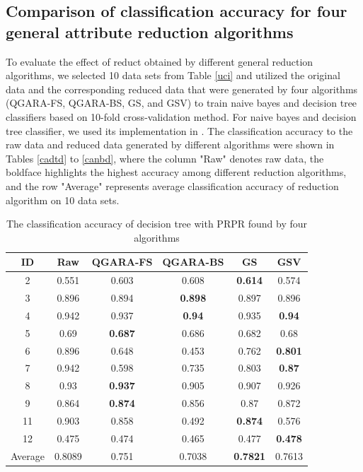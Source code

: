 \documentclass[review]{elsarticle}
\begin{document}
	\subsection{Comparison of classification accuracy for four general attribute reduction algorithms}
		\par To evaluate the effect of reduct obtained by different general reduction algorithms, we selected 10 data sets from Table \ref{uci} and utilized the original data and the corresponding reduced data that were generated by four algorithms (QGARA-FS, QGARA-BS, GS, and GSV) to train naive bayes and decision tree classifiers based on 10-fold cross-validation method. For naive bayes and decision tree classifier, we used its implementation in \cite{scikit-learn}. The classification accuracy to the raw data and reduced data generated by different algorithms were shown in Tables \ref{cadtd} to \ref{canbd}, where the column "Raw" denotes raw data, the boldface highlights the highest accuracy among different reduction algorithms, and the row "Average" represents average classification accuracy of reduction algorithm on 10 data sets.
		\begin{table}[htbp]
			\centering
			\caption{The classification accuracy of decision tree with PRPR found by four algorithms}
			\begin{tabular}{cccccc}
				\hline
				ID    & Raw   & QGARA-FS & QGARA-BS & GS    & GSV \\\hline
				2     & 0.551 & 0.603 & 0.608 & \textbf{0.614} & 0.574 \\
				3     & 0.896 & 0.894 & \textbf{0.898} & 0.897 & 0.896 \\
				4     & 0.942 & 0.937 & \textbf{0.94} & 0.935 & \textbf{0.94} \\
				5     & 0.69  & \textbf{0.687} & 0.686 & 0.682 & 0.68 \\
				6     & 0.896 & 0.648 & 0.453 & 0.762 & \textbf{0.801} \\
				7     & 0.942 & 0.598 & 0.735 & 0.803 & \textbf{0.87} \\
				8     & 0.93  & \textbf{0.937} & 0.905 & 0.907 & 0.926 \\
				9     & 0.864 & \textbf{0.874} & 0.856 & 0.87  & 0.872 \\
				11    & 0.903 & 0.858 & 0.492 & \textbf{0.874} & 0.576 \\
				12    & 0.475 & 0.474 & 0.465 & 0.477 & \textbf{0.478} \\\hline
				Average & 0.8089 & 0.751 & 0.7038 & \textbf{0.7821} & 0.7613 \\\hline
			\end{tabular}%
			\label{cadtp}%
		\end{table}%
\end{document}
